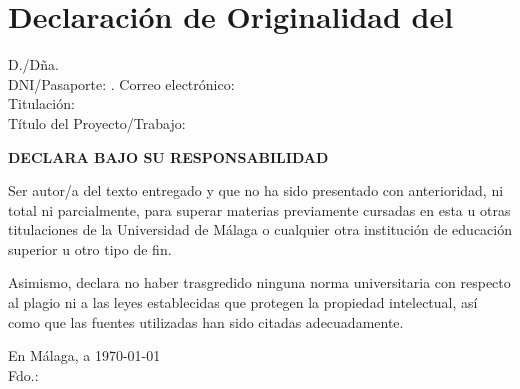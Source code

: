 
\chapter*{Declaración de Originalidad del \tfeTFE}

\begin{flushleft}
    {\fontsize{13}{30} D./Dña. \tfeAuthor \\}
    \bigskip
    {\fontsize{13}{15} DNI/Pasaporte: \tfeNIF. Correo electrónico: \tfeEmail\\}
    \bigskip
    {\fontsize{13}{15} Titulación: \tfeDegree\\}
    \bigskip
    {\fontsize{13}{15} Título del Proyecto/Trabajo: \tfeTitle\\}
    \bigskip
\end{flushleft}

\begin{center}
    {\LARGE \textbf{DECLARA BAJO SU RESPONSABILIDAD\\}}
    \bigskip
\end{center}

Ser autor/a del texto entregado y que no ha sido presentado con anterioridad, ni total ni parcialmente, para superar materias previamente cursadas en esta u otras titulaciones de la Universidad de Málaga o cualquier otra institución de educación superior u otro tipo de fin.


Asimismo, declara no haber trasgredido ninguna norma universitaria con respecto al plagio ni a las leyes establecidas que protegen la propiedad intelectual, así como que las fuentes utilizadas han sido citadas adecuadamente.

\vspace{1cm}


\begin{flushright}
    {\fontsize{14}{40} En Málaga, a \today\\}
    \vspace{4cm}
    {\fontsize{14}{30}\textsf Fdo.: \tfeAuthor}
\end{flushright}

